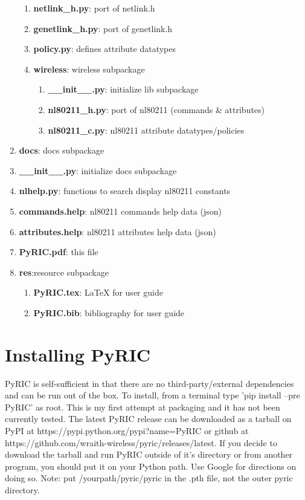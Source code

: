 \documentclass[11pt]{article}
\begin{document}
\begin{enumerate}
\begin{enumerate}
\item \textbf{netlink\_h.py}: port of netlink.h
\item \textbf{genetlink\_h.py}: port of genetlink.h
\item \textbf{policy.py}: defines attribute datatypes
\item \textbf{wireless}: wireless subpackage
\begin{enumerate}
\item \textbf{\_\_init\_\_.py}: initialize lib subpackage
\item \textbf{nl80211\_h.py}: port of nl80211 (commands \& attributes)
\item \textbf{nl80211\_c.py}: nl80211 attribute datatypes/policies
\end{enumerate}
\end{enumerate}
\item \textbf{docs}: docs subpackage
\item \textbf{\_\_init\_\_.py}: initialize docs subpackage
\item \textbf{nlhelp.py}: functions to search display nl80211 constants
\item \textbf{commands.help}: nl80211 commands help data (json)
\item \textbf{attributes.help}: nl80211 attributes help data (json)
\item \textbf{PyRIC.pdf}: this file
\item \textbf{res}:resource subpackage
\begin{enumerate}
\item \textbf{PyRIC.tex}: LaTeX for user guide
\item \textbf{PyRIC.bib}: bibliography for user guide
\end{enumerate}
\end{enumerate}

\section{Installing PyRIC}\label{sec:installing}
PyRIC is self-sufficient in that there are no third-party/external dependencies 
and can be run out of the box. To install, from a terminal type 'pip install 
--pre PyRIC' as root. This is my first attempt at packaging and it has not been
currently tested. The latest PyRIC release can be downloaded as a tarball on PyPI
at https://pypi.python.org/pypi?name=PyRIC or github at 
https://github.com/wraith-wireless/pyric/releases/latest. If you decide to download
the tarball and run PyRIC outside of it's directory or from another program, you 
should put it on your Python path. Use Google for directions on doing so. Note:
put /yourpath/pyric/pyric in the .pth file, not the outer pyric directory.
\end{document}
